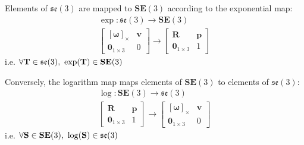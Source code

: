		Elements of $\mathfrak{se}(3)$ are mapped to $\textbf{SE}(3)$ according to the exponential map:
			\begin{equation}
				\begin{split}
					\exp: \mathfrak{se}(3) \rightarrow \mathbf{SE}(3)\\
					\begin{bmatrix}
						  [\mathbf{\omega}]_\times	&  \mathbf{v}\\
						  \textbf{0}_{1 \times 3} & 0						  
					\end{bmatrix}
					\rightarrow 
					\begin{bmatrix}
						  \mathbf{R}	&	\mathbf{p} \\
						  \textbf{0}_{1 \times 3}		& 	1 
					\end{bmatrix}
				\end{split}		
			\end{equation}		
			i.e. $\forall \mathbf{T} \in \mathfrak{se}(3) \textnormal{, } \exp(\mathbf{T}) \in  \mathbf{SE}(3)$
			
			Conversely, the logarithm map maps elements of $\mathbf{SE}(3)$ to elements of $\mathfrak{se}(3)$:
			\begin{equation}
				\begin{split}
					\log: \mathbf{SE}(3) \rightarrow \mathfrak{se}(3)\\
					\begin{bmatrix}
						\mathbf{R}	&	\mathbf{p} \\
						\textbf{0}_{1 \times 3}		& 	1 					 				  
					\end{bmatrix}
					\rightarrow 
					\begin{bmatrix}
					 	[\mathbf{\omega}]_\times	&  \mathbf{v}\\
					 	\textbf{0}_{1 \times 3} & 0			
					\end{bmatrix}
				\end{split}		
			\end{equation}		
			i.e. $\forall \mathbf{S} \in \mathbf{SE}(3)  \textnormal{, } \log(\mathbf{S}) \in  \mathfrak{se}(3)$
		
